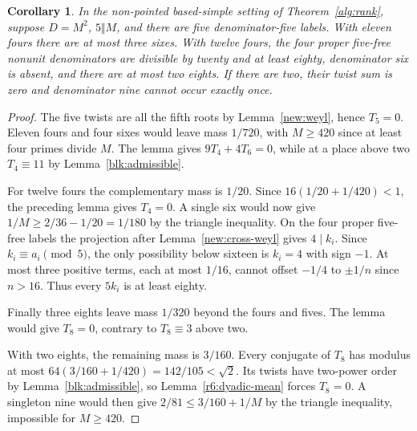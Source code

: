 \documentclass[11pt]{amsart}
\numberwithin{equation}{section}
\newtheorem{corollary}[theorem]{Corollary}
\theoremstyle{definition}
\theoremstyle{plain}
\begin{document}
\begin{corollary}\label{new:small-Gauss}
In the non-pointed based-simple setting of Theorem~\ref{alg:rank},
suppose $D=M^2$, $5\Vert M$, and there are five denominator-five labels.
With eleven fours there are at most three sixes. With twelve fours,
the four proper five-free nonunit denominators are divisible by
twenty and at least eighty, denominator six is absent, and there
are at most two eights. If there are two, their twist sum is zero
and denominator nine cannot occur exactly once.
\end{corollary}
\begin{proof}
The five twists are all the fifth roots by
Lemma~\ref{new:weyl}, hence $T_5=0$. Eleven fours and four sixes
would leave mass $1/720$, with $M\ge420$ since at least four primes
divide $M$. The lemma gives $9T_4+4T_6=0$, while at a place above
two $T_4\equiv11$ by Lemma~\ref{blk:admissible}.

For twelve fours the complementary mass is $1/20$. Since
$16(1/20+1/420)<1$, the preceding lemma gives $T_4=0$.
A single six would now give $1/M\ge2/36-1/20=1/180$ by the
triangle inequality. On the four proper five-free labels the
projection after Lemma~\ref{new:cross-weyl} gives $4\mid k_i$.
Since $k_i\equiv a_i\pmod5$, the only possibility below sixteen is
$k_i=4$ with sign $-1$. At most three positive terms, each at most
$1/16$, cannot offset $-1/4$ to $\pm1/n$ since $n>16$.
Thus every $5k_i$ is at least eighty.

Finally three eights leave mass $1/320$ beyond the fours and fives.
The lemma would give $T_8=0$, contrary to $T_8\equiv3$ above two.

With two eights, the remaining mass is $3/160$. Every conjugate of
$T_8$ has modulus at most $64(3/160+1/420)=142/105<\sqrt2$.
Its twists have two-power order by Lemma~\ref{blk:admissible}, so
Lemma~\ref{r6:dyadic-mean} forces $T_8=0$. A singleton nine would
then give $2/81\le3/160+1/M$ by the triangle inequality, impossible
for $M\ge420$.
\end{proof}
\end{document}
